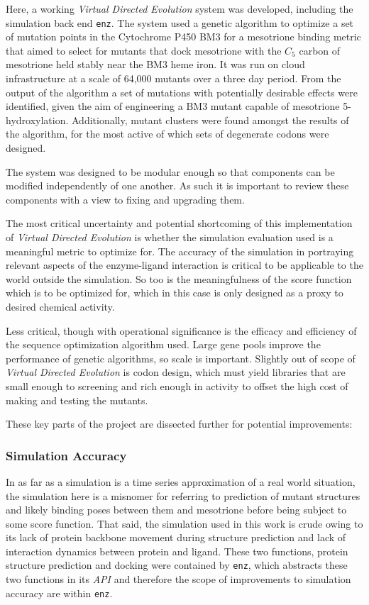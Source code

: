 \documentclass[16pt]{book}
\begin{document}
Here, a working \textit{Virtual Directed Evolution} system was developed, including the simulation back end \texttt{enz}.
The system used a genetic algorithm to optimize a set of mutation points in the Cytochrome P450 BM3 for a mesotrione binding metric that aimed to select for mutants that dock mesotrione with the $C_5$ carbon of mesotrione held stably near the BM3 heme iron.
It was run on cloud infrastructure at a scale of 64,000 mutants over a three day period.
From the output of the algorithm a set of mutations with potentially desirable effects were identified, given the aim of engineering a BM3 mutant capable of mesotrione 5-hydroxylation.
Additionally, mutant clusters were found amongst the results of the algorithm, for the most active of which sets of degenerate codons were designed.

The system was designed to be modular enough so that components can be modified independently of one another.
As such it is important to review these components with a view to fixing and upgrading them.

The most critical uncertainty and potential shortcoming of this implementation of \textit{Virtual Directed Evolution} is whether the simulation evaluation used is a meaningful metric to optimize for.
The accuracy of the simulation in portraying relevant aspects of the enzyme-ligand interaction is critical to be applicable to the world outside the simulation.
So too is the meaningfulness of the score function which is to be optimized for, which in this case is only designed as a proxy to desired chemical activity.

Less critical, though with operational significance is the efficacy and efficiency of the sequence optimization algorithm used.
Large gene pools improve the performance of genetic algorithms, so scale is important.
Slightly out of scope of \textit{Virtual Directed Evolution} is codon design, which must yield libraries that are small enough to screening and rich enough in activity to offset the high cost of making and testing the mutants.

These key parts of the project are dissected further for potential improvements:

\subsubsection{Simulation Accuracy}
In as far as a simulation is a time series approximation of a real world situation, the simulation here is a misnomer for referring to prediction of mutant structures and likely binding poses between them and mesotrione before being subject to some score function.
That said, the simulation used in this work is crude owing to its lack of protein backbone movement during structure prediction and lack of interaction dynamics between protein and ligand.
These two functions, protein structure prediction and docking were contained by \texttt{enz}, which abstracts these two functions in its \textit{API} and therefore the scope of improvements to simulation accuracy are within \texttt{enz}.
\end{document}
